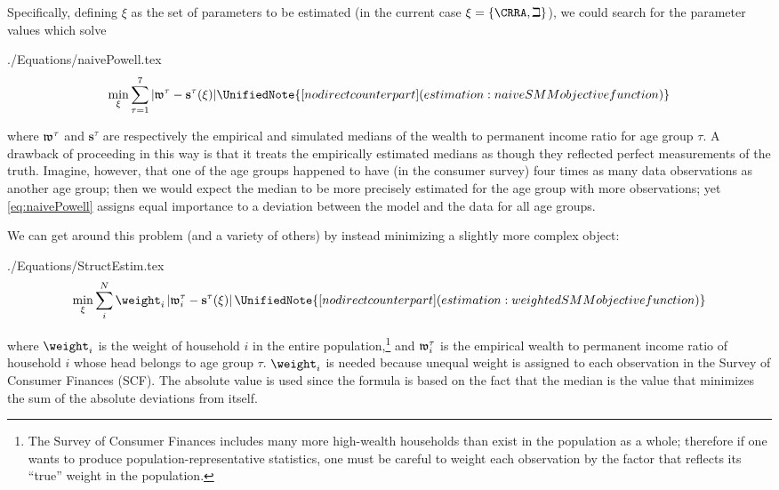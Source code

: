 \documentclass[SolvingMicroDSOPs]{subfiles}
\begin{document}
Specifically, defining $\xi$ as the set of parameters
to be estimated (in the current case $\xi =\{\CRRA ,\beth\}$), we could search for
the parameter values which solve
\begin{verbatimwrite}{./Equations/naivePowell.tex}
  \begin{equation}
    \begin{gathered}
      \begin{aligned}
        \min_{\xi} \sum_{\tau=1}^{7} |\wRatio^{\tau} -\mathbf{s}^{\tau}(\xi)|  \label{eq:naivePowell}
        \UnifiedNote{[no direct counterpart] (estimation: naive SMM objective function)}
      \end{aligned}
    \end{gathered}
  \end{equation}
\end{verbatimwrite}
\unskip
where $\mathfrak{w}^{\tau}$ and $\mathbf{s}^{\tau}$ are respectively the empirical
and simulated medians of the wealth to permanent income ratio for age group $\tau$.
A drawback of proceeding in this way is that it treats the empirically
estimated medians as though they reflected perfect measurements of the
truth. Imagine, however, that one of the age groups happened to have
(in the consumer survey) four times as many data observations as
another age group; then we would expect the median to be more
precisely estimated for the age group with more observations; yet
\eqref{eq:naivePowell} assigns equal importance to a deviation between
the model and the data for all age groups.

We can get around this problem (and a variety of others) by instead minimizing a slightly more complex object:
\hypertarget{eq-StructEstim}{}
\begin{verbatimwrite}{./Equations/StructEstim.tex}
  \begin{equation}
    \min_{\xi}\sum_{i}^{N}\weight _{i}\left|\wRatio_{i}^{\tau }-\mathbf{s}^{\tau}(\xi )\right|\label{eq:StructEstim}
    \UnifiedNote{[no direct counterpart] (estimation: weighted SMM objective function)}
  \end{equation}
\end{verbatimwrite}
\unskip
where $\weight_{i}$ is the weight of household $i$ in the entire
population,\footnote{The Survey of Consumer Finances includes many
  more high-wealth households than exist in the population as a whole;
  therefore if one wants to produce population-representative
  statistics, one must be careful to weight each observation by the
  factor that reflects its ``true'' weight in the population.} and
$\mathfrak{w}_{i}^{\tau}$ is the empirical wealth to permanent income
ratio of household $i$ whose head belongs to age group
$\tau$. $\weight _{i}$ is needed because unequal weight is assigned to
each observation in the Survey of Consumer Finances (SCF). The
absolute value is used since the formula is based on the fact that the
median is the value that minimizes the sum of the absolute deviations
from itself.
\end{document}
